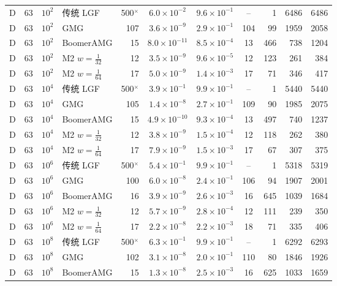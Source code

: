 \begin{longtable}{lrrlrcccrrr}
D & 63 & $10^{2}$ & 传统 LGF & 500$^\times$ & $6.0{\times}10^{-2}$ & $9.6{\times}10^{-1}$ & -- & 1 & 6486 & 6486 \\
D & 63 & $10^{2}$ & GMG & 107 & $3.6{\times}10^{-9}$ & $2.9{\times}10^{-1}$ & 104 & 99 & 1959 & 2058 \\
D & 63 & $10^{2}$ & BoomerAMG & 15 & $8.0{\times}10^{-11}$ & $8.5{\times}10^{-4}$ & 13 & 466 & 738 & 1204 \\
D & 63 & $10^{2}$ & M2 $w{=}\frac1{32}$ & 12 & $3.5{\times}10^{-9}$ & $9.6{\times}10^{-5}$ & 12 & 123 & 261 & 384 \\
D & 63 & $10^{2}$ & M2 $w{=}\frac1{64}$ & 17 & $5.0{\times}10^{-9}$ & $1.4{\times}10^{-3}$ & 17 & 71 & 346 & 417 \\
D & 63 & $10^{4}$ & 传统 LGF & 500$^\times$ & $3.9{\times}10^{-1}$ & $9.9{\times}10^{-1}$ & -- & 1 & 5440 & 5440 \\
D & 63 & $10^{4}$ & GMG & 105 & $1.4{\times}10^{-8}$ & $2.7{\times}10^{-1}$ & 109 & 90 & 1985 & 2075 \\
D & 63 & $10^{4}$ & BoomerAMG & 15 & $4.9{\times}10^{-10}$ & $9.3{\times}10^{-4}$ & 13 & 497 & 740 & 1237 \\
D & 63 & $10^{4}$ & M2 $w{=}\frac1{32}$ & 12 & $3.8{\times}10^{-9}$ & $1.5{\times}10^{-4}$ & 12 & 118 & 262 & 380 \\
D & 63 & $10^{4}$ & M2 $w{=}\frac1{64}$ & 17 & $7.9{\times}10^{-9}$ & $1.5{\times}10^{-3}$ & 17 & 67 & 307 & 375 \\
D & 63 & $10^{6}$ & 传统 LGF & 500$^\times$ & $5.4{\times}10^{-1}$ & $9.9{\times}10^{-1}$ & -- & 1 & 5318 & 5319 \\
D & 63 & $10^{6}$ & GMG & 100 & $6.0{\times}10^{-8}$ & $2.4{\times}10^{-1}$ & 106 & 94 & 1907 & 2001 \\
D & 63 & $10^{6}$ & BoomerAMG & 16 & $3.9{\times}10^{-9}$ & $2.6{\times}10^{-3}$ & 16 & 645 & 1039 & 1684 \\
D & 63 & $10^{6}$ & M2 $w{=}\frac1{32}$ & 12 & $5.7{\times}10^{-9}$ & $2.8{\times}10^{-4}$ & 12 & 111 & 239 & 350 \\
D & 63 & $10^{6}$ & M2 $w{=}\frac1{64}$ & 17 & $2.2{\times}10^{-8}$ & $2.2{\times}10^{-3}$ & 18 & 71 & 335 & 406 \\
D & 63 & $10^{8}$ & 传统 LGF & 500$^\times$ & $6.3{\times}10^{-1}$ & $9.9{\times}10^{-1}$ & -- & 1 & 6292 & 6293 \\
D & 63 & $10^{8}$ & GMG & 102 & $3.1{\times}10^{-8}$ & $2.0{\times}10^{-1}$ & 110 & 80 & 1846 & 1926 \\
D & 63 & $10^{8}$ & BoomerAMG & 15 & $1.3{\times}10^{-8}$ & $2.5{\times}10^{-3}$ & 16 & 625 & 1033 & 1659 \\

\end{longtable}
